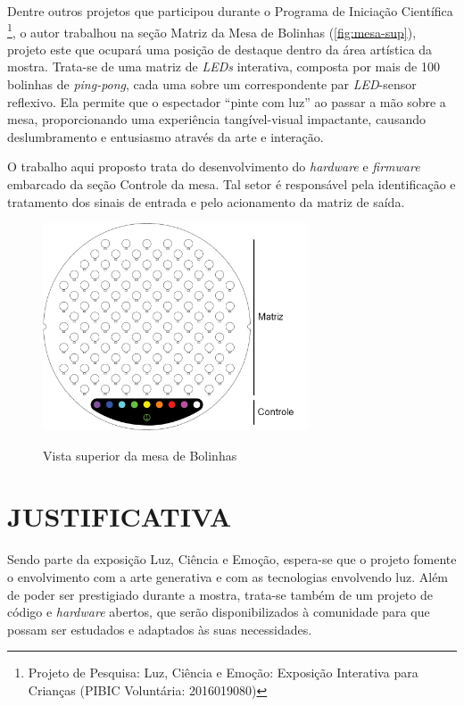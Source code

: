   Dentre outros projetos que participou durante o Programa de Iniciação Científica \footnote{Projeto de Pesquisa: Luz, Ciência e Emoção: Exposição Interativa para Crianças (PIBIC Voluntária: 2016019080)}, o autor trabalhou na seção Matriz da Mesa de Bolinhas (\autoref{fig:mesa-sup}), projeto este que ocupará uma posição de destaque dentro da área artística da mostra. Trata-se de uma matriz de \emph{LEDs} interativa, composta por mais de 100 bolinhas de \emph{ping-pong}, cada uma sobre um correspondente par \emph{LED}-sensor reflexivo. Ela permite que o espectador ``pinte com luz'' ao passar a mão sobre a mesa, proporcionando uma experiência tangível-visual impactante, causando deslumbramento e entusiasmo através da arte e interação.
  
  O trabalho aqui proposto trata do desenvolvimento do \emph{hardware} e \emph{firmware} embarcado da seção Controle da mesa. Tal setor é responsável pela identificação e tratamento dos sinais de entrada e pelo acionamento da matriz de saída.

\begin{figure}[H]%
    \centering
    \caption{Vista superior da mesa de Bolinhas}
    \includegraphics[width=0.7\textwidth]{./dados/figuras/mesa-cad}
    \label{fig:mesa-sup}
\end{figure}

\section{JUSTIFICATIVA}
\label{sec:justificativa}

  Sendo parte da exposição Luz, Ciência e Emoção, espera-se que o projeto fomente o envolvimento com a arte generativa e com as tecnologias envolvendo luz. Além de poder ser prestigiado durante a mostra, trata-se também de um projeto de código e \emph{hardware} abertos, que serão disponibilizados à comunidade para que possam ser estudados e adaptados às suas necessidades.

